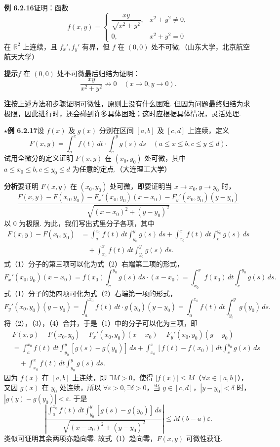 \documentclass[UTF8,12pt,a4paper,fontset=fandol]{ctexart}
\begin{document}
\noindent\textbf{例 6.2.16}\quad 证明：函数
\[
  f(x,y)=
  \begin{cases}
  \dfrac{xy}{\sqrt{x^2+y^2}}, & x^2+y^2\ne0,\\
  0, & x^2+y^2=0
  \end{cases}
\]
在 $\mathbb{R}^2$ 上连续，且 $f_x',f_y'$ 有界，但 $f$ 在 $(0,0)$ 处不可微.（山东大学，北京航空航天大学）

\noindent\textbf{提示}\quad $f$ 在 $(0,0)$ 处不可微最后归结为证明：
\[
  \frac{xy}{x^2+y^2}\not\to0\quad(x\to0,y\to0).
\]

\noindent\textbf{注}\quad 按上述方法和步骤证明可微性，原则上没有什么困难. 但因为问题最终归结为求极限，因此进行时，还会碰到许多具体困难；这时应根据具体情况，灵活处理.

\noindent\textbf{\ensuremath{\star}例 6.2.17}\quad 设 $f(x)$ 及 $g(x)$ 分别在区间 $[a,b]$ 及 $[c,d]$ 上连续，定义
\[
  F(x,y)=\int_a^x f(t)\,dt\cdot\int_c^y g(s)\,ds\quad(a\le x\le b,c\le y\le d).
\]
试用全微分的定义证明 $F(x,y)$ 在 $(x_0,y_0)$ 处可微，其中 $a\le x_0\le b,c\le y_0\le d$ 为任意的定点.（大连理工大学）

\noindent\textbf{分析}\quad 要证明 $F(x,y)$ 在 $(x_0,y_0)$ 处可微，即要证明当 $x\to x_0,y\to y_0$ 时，
\[
  \frac{F(x,y)-F(x_0,y_0)-F_x'(x_0,y_0)(x-x_0)-F_y'(x_0,y_0)(y-y_0)}
  {\sqrt{(x-x_0)^2+(y-y_0)^2}}
\]
以 $0$ 为极限. 为此，我们写出式里分子各项，其中
\begin{equation}
\begin{aligned}
F(x,y)-F(x_0,y_0)
&=\int_a^{x_0}f(t)\,dt\int_{y_0}^y g(s)\,ds
+\int_{x_0}^x f(t)\,dt\int_c^{y_0}g(s)\,ds\\
&\quad+\int_{x_0}^x f(t)\,dt\int_{y_0}^y g(s)\,ds.
\end{aligned}
\tag{2}
\end{equation}
式（1）分子的第三项可以化为式（2）右端第二项的形式，
\[
  F_x'(x_0,y_0)(x-x_0)
  =f(x_0)\int_c^{y_0}g(s)\,ds\cdot(x-x_0)
  =\int_{x_0}^x f(x_0)\,dt\int_c^{y_0}g(s)\,ds. \tag{3}
\]
式（1）分子的第四项可化为式（2）右端第一项的形式，
\[
  F_y'(x_0,y_0)(y-y_0)
  =\int_a^{x_0}f(t)\,dt\cdot g(y_0)(y-y_0)
  =\int_a^{x_0}f(t)\,dt\int_{y_0}^y g(y_0)\,ds. \tag{4}
\]
将（2），（3），（4）合并，于是（1）中的分子可以化为三项，即
\begin{equation}
\begin{aligned}
&F(x,y)-F(x_0,y_0)-F_x'(x_0,y_0)(x-x_0)-F_y'(x_0,y_0)(y-y_0)\\
&=\int_a^{x_0}f(t)\,dt\int_{y_0}^y[g(s)-g(y_0)]\,ds
+\int_{x_0}^x[f(t)-f(x_0)]\,dt\int_c^{y_0}g(s)\,ds\\
&\quad+\int_{x_0}^x f(t)\,dt\int_{y_0}^y g(s)\,ds.
\end{aligned}
\tag{5}
\end{equation}
因为 $f(x)$ 在 $[a,b]$ 上连续，即 $\exists M>0$，使得 $|f(x)|\le M$（$\forall x\in[a,b]$），又因 $g(x)$ 在 $y_0$ 处连续，所以 $\forall\varepsilon>0,\exists\delta>0$，当 $y\in[c,d]$，$|y-y_0|<\delta$ 时，$|g(y)-g(y_0)|<\varepsilon$. 于是
\[
\left|
\frac{\int_a^{x_0}f(t)\,dt\int_{y_0}^y[g(s)-g(y_0)]\,ds}
{\sqrt{(x-x_0)^2+(y-y_0)^2}}
\right|
\le M(b-a)\varepsilon.
\]
类似可证明其余两项亦趋向零. 故式（1）趋向零，$F(x,y)$ 可微性获证.
\end{document}
